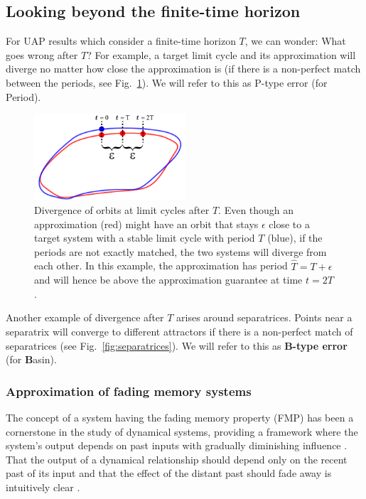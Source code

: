 \documentclass{article}
\theoremstyle{definition}
\theoremstyle{remark}
\newcounter{ct}
\begin{document}
\subsection{Looking beyond the finite-time horizon}\label{sec:beyondfinitetime}

For UAP results which consider a finite-time horizon $T$, we can wonder: What goes wrong after $T$?
%
For example, a target limit cycle and its approximation will diverge no matter how close the approximation is (if there is a non-perfect match between the periods, see Fig.~\ref{fig:lc_period_div}).
We will refer to this as P-type error (for Period).

\setlength\belowcaptionskip{-5ex}
\begin{figure}
  \centering
  \includegraphics[width=0.5\textwidth]{lc_period_div}
  \caption{Divergence of orbits at limit cycles after $T$.
  Even though an approximation (red) might have an orbit that stays $\epsilon$ close to a target system with a stable limit cycle with period $T$ (blue), if the periods are not exactly matched, the two systems will diverge from each other.
  In this example, the approximation has period $\hat{T} = T+\epsilon$ and will hence be above the approximation guarantee at time $t=2T$.
  }\label{fig:lc_period_div}
\end{figure}

Another example of divergence after $T$ arises around separatrices.
Points near a separatrix will converge to different attractors if there is a non-perfect match of separatrices (see Fig.~\ref{fig:separatrices}).
We will refer to this as \textbf{B-type error} (for \textbf{B}asin).



\subsubsection{Approximation of fading memory systems}\label{sec:fadingmemory}
The concept of a system having the fading memory property (FMP) has been a cornerstone in the study of dynamical systems\citep{coleman1968general}, providing a framework where the system’s output depends on past inputs with gradually diminishing influence \citep{boyd1985fading}.
That the output of a dynamical relationship should depend only on the recent past of its input and that the effect of the distant past should fade away is intuitively clear  \citep{sepulchre2021fading}.
\end{document}
